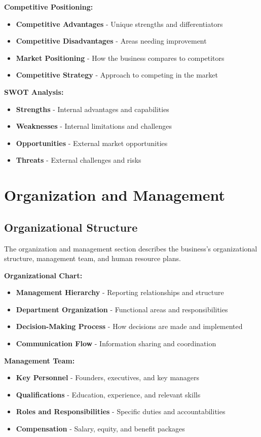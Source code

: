\documentclass[12pt]{article}
\begin{document}
\textbf{Competitive Positioning:}
\begin{itemize}
    \item \textbf{Competitive Advantages} - Unique strengths and differentiators
    \item \textbf{Competitive Disadvantages} - Areas needing improvement
    \item \textbf{Market Positioning} - How the business compares to competitors
    \item \textbf{Competitive Strategy} - Approach to competing in the market
\end{itemize}

\textbf{SWOT Analysis:}
\begin{itemize}
    \item \textbf{Strengths} - Internal advantages and capabilities
    \item \textbf{Weaknesses} - Internal limitations and challenges
    \item \textbf{Opportunities} - External market opportunities
    \item \textbf{Threats} - External challenges and risks
\end{itemize}

\section{Organization and Management}

\subsection{Organizational Structure}
The organization and management section describes the business's organizational structure, management team, and human resource plans.

\textbf{Organizational Chart:}
\begin{itemize}
    \item \textbf{Management Hierarchy} - Reporting relationships and structure
    \item \textbf{Department Organization} - Functional areas and responsibilities
    \item \textbf{Decision-Making Process} - How decisions are made and implemented
    \item \textbf{Communication Flow} - Information sharing and coordination
\end{itemize}

\textbf{Management Team:}
\begin{itemize}
    \item \textbf{Key Personnel} - Founders, executives, and key managers
    \item \textbf{Qualifications} - Education, experience, and relevant skills
    \item \textbf{Roles and Responsibilities} - Specific duties and accountabilities
    \item \textbf{Compensation} - Salary, equity, and benefit packages
\end{itemize}
\end{document}
